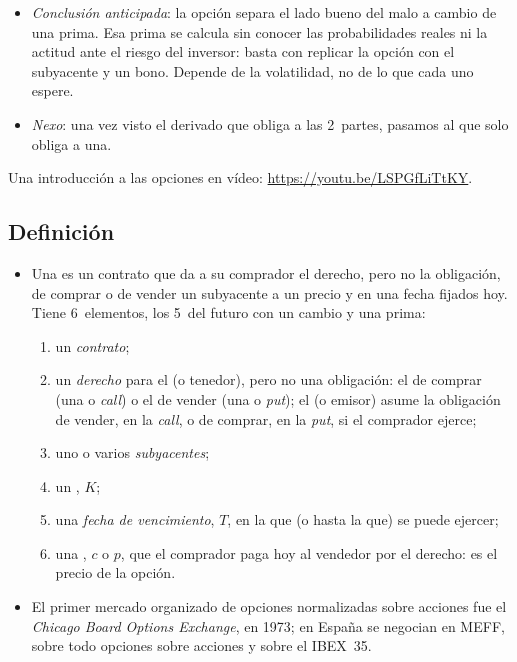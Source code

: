 \documentclass[11pt]{article}
\begin{document}
\begin{itemize}
\item \emph{Conclusión anticipada}: la opción separa el lado bueno del malo a cambio de una prima. Esa prima se calcula sin conocer las probabilidades reales ni la actitud ante el riesgo del inversor: basta con replicar la opción con el subyacente y un bono. Depende de la volatilidad, no de lo que cada uno espere.
\item \emph{Nexo}: una vez visto el derivado que obliga a las 2~partes, pasamos al que solo obliga a una.
\end{itemize}

\begin{anotaciones}
Una introducción a las opciones en vídeo: \url{https://youtu.be/LSPGfLiTtKY}.
\end{anotaciones}

\subsection{Definición}\label{sec:definicion-opciones}

\begin{itemize}
\item Una  es un contrato que da a su comprador el derecho, pero no la obligación, de comprar o de vender un subyacente a un precio y en una fecha fijados hoy. Tiene 6~elementos, los 5~del futuro con un cambio y una prima:
  \begin{enumerate}
  \item un \emph{contrato};
  \item un \emph{derecho} para el  (o tenedor), pero no una obligación: el de comprar (una  o \emph{call}) o el de vender (una  o \emph{put}); el  (o emisor) asume la obligación de vender, en la \emph{call}, o de comprar, en la \emph{put}, si el comprador ejerce;
  \item uno o varios \emph{subyacentes};
  \item un , $K$;
  \item una \emph{fecha de vencimiento}, $T$, en la que (o hasta la que) se puede ejercer;
  \item una , $c$ o $p$, que el comprador paga hoy al vendedor por el derecho: es el precio de la opción.
  \end{enumerate}
\item El primer mercado organizado de opciones normalizadas sobre acciones fue el \emph{Chicago Board Options Exchange}, en 1973\nocite{Cboe2020Form10K}; en España se negocian en MEFF, sobre todo opciones sobre acciones y sobre el IBEX~35\nocite{BME2026InformeMercado}.
\end{itemize}
\end{document}
